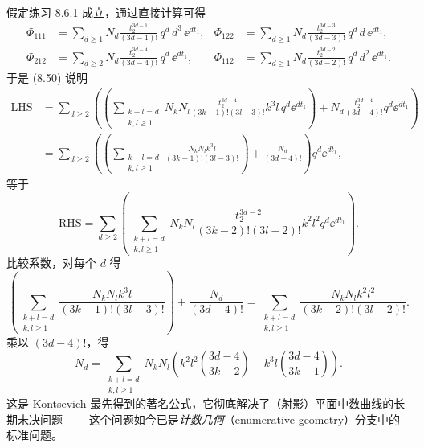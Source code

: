 假定练习 8.6.1 成立，通过直接计算可得
\begin{align*}
  \Phi_{111}&=\sum_{d\ge1}N_d\frac{t_2^{3d-1}}{(3d-1)!}\,q^d\,d^3\,\ee^{dt_1},
  &\Phi_{122}&=\sum_{d\ge1}N_d\frac{t_2^{3d-3}}{(3d-3)!}\,q^d\,d\,\ee^{dt_1},\\
  \Phi_{212}&=\sum_{d\ge2}N_d\frac{t_2^{3d-4}}{(3d-4)!}\,q^d\,\ee^{dt_1},
  &\Phi_{112}&=\sum_{d\ge1}N_d\frac{t_2^{3d-2}}{(3d-2)!}\,q^d\,d^2\,\ee^{dt_1}.
\end{align*}
于是 (8.50) 说明
\begin{align*}
  \mathrm{LHS}
  &=\sum_{d\ge2}\left(\left(\sum_{\substack{k+l=d\\ k,l\ge1}}
    N_kN_l\frac{t_2^{3d-4}}{(3k-1)!(3l-3)!}k^3l\,q^d\ee^{dt_1}\right)
    +N_d\frac{t_2^{3d-4}}{(3d-4)!}q^d\ee^{dt_1}\right)\\
  &=\sum_{d\ge2}\left(\left(\sum_{\substack{k+l=d\\ k,l\ge1}}
    \frac{N_kN_lk^3l}{(3k-1)!(3l-3)!}\right)
    +\frac{N_d}{(3d-4)!}\right)q^d\ee^{dt_1},
\end{align*}
等于
\[
  \mathrm{RHS}=\sum_{d\ge2}
  \left(\sum_{\substack{k+l=d\\ k,l\ge1}}
  N_kN_l\frac{t_2^{3d-2}}{(3k-2)!(3l-2)!}k^2l^2q^d\ee^{dt_1}\right).
\]
比较系数，对每个 $d$ 得
\[
  \left(\sum_{\substack{k+l=d\\ k,l\ge1}}
  \frac{N_kN_lk^3l}{(3k-1)!(3l-3)!}\right)+\frac{N_d}{(3d-4)!}
  =\sum_{\substack{k+l=d\\ k,l\ge1}}
  \frac{N_kN_lk^2l^2}{(3k-2)!(3l-2)!}.
\]
乘以 $(3d-4)!$，得
\begin{equation}
  N_d=\sum_{\substack{k+l=d\\ k,l\ge1}}N_kN_l
  \left(k^2l^2\binom{3d-4}{3k-2}-k^3l\binom{3d-4}{3k-1}\right).
  \tag{8.51}
\end{equation}
这是 Kontsevich 最先得到的著名公式，它彻底解决了（射影）平面中数曲线的长期未决问题——
这个问题如今已是\emph{计数几何}（enumerative geometry）分支中的标准问题。

